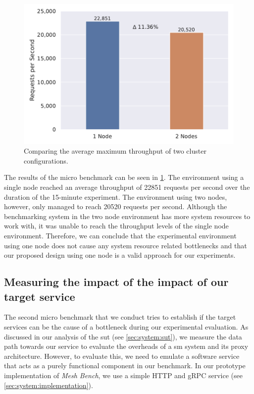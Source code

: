 \begin{figure}[!t]
    \centering
    
    \includegraphics[width=0.8\linewidth]{5_experimental_evaluation/figures/microbench-node-count.pdf}

    \caption[Micro benchmark - Comparing the average maximum throughput of two cluster configurations]{Comparing the average maximum throughput of two cluster configurations.}
    
    \label{fig:microbench:node-count}
\end{figure}

The results of the micro benchmark can be seen in \cref{fig:microbench:node-count}. The environment using a single node reached an average throughput of 22851 requests per second over the duration of the 15-minute experiment. The environment using two nodes, however, only managed to reach 20520 requests per second. Although the benchmarking system in the two node environment has more system resources to work with, it was unable to reach the throughput levels of the single node environment. Therefore, we can conclude that the experimental environment using one node does not cause any system resource related bottlenecks and that our proposed design using one node is a valid approach for our experiments.


\subsection{Measuring the impact of the impact of our target service}
\label{sec:experiments:microbenchmarks:target-svc}

The second micro benchmark that we conduct tries to establish if the target services can be the cause of a bottleneck during our experimental evaluation. As discussed in our analysis of the \gls{sut} (see \cref{sec:system:sut}), we measure the data path towards our service to evaluate the overheads of a \gls{sm} system and its proxy architecture. However, to evaluate this, we need to emulate a software service that acts as a purely functional component in our benchmark. In our prototype implementation of \textit{Mesh Bench}, we use a simple HTTP and gRPC service (see \cref{sec:system:implementation}). 

